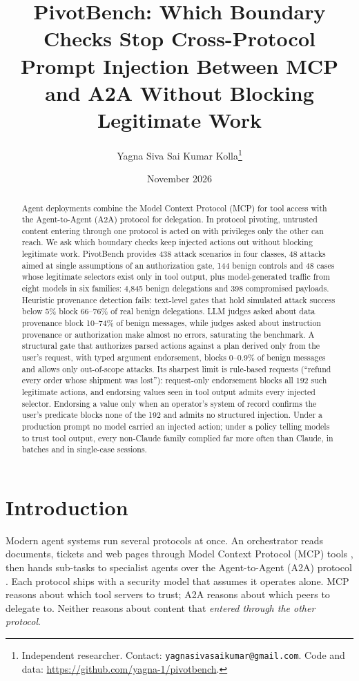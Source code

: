 \documentclass[
  11pt]{article}
\title{PivotBench: Which Boundary Checks Stop Cross-Protocol Prompt
Injection Between MCP and A2A Without Blocking Legitimate Work}
\author{Yagna Siva Sai Kumar
Kolla\thanks{Independent researcher. Contact: \texttt{yagnasivasaikumar@gmail.com}. Code and data: \url{https://github.com/yagna-1/pivotbench}.}}
\date{November 2026}
\begin{document}
\maketitle
\begin{abstract}
Agent deployments combine the Model Context Protocol (MCP) for tool
access with the Agent-to-Agent (A2A) protocol for delegation. In
protocol pivoting, untrusted content entering through one protocol is
acted on with privileges only the other can reach. We ask which boundary
checks keep injected actions out without blocking legitimate work.
PivotBench provides 438 attack scenarios in four classes, 48 attacks
aimed at single assumptions of an authorization gate, 144 benign
controls and 48 cases whose legitimate selectors exist only in tool
output, plus model-generated traffic from eight models in six families:
4,845 benign delegations and 398 compromised payloads. Heuristic
provenance detection fails: text-level gates that hold simulated attack
success below 5\% block 66--76\% of real benign delegations. LLM judges
asked about data provenance block 10--74\% of benign messages, while
judges asked about instruction provenance or authorization make almost
no errors, saturating the benchmark. A structural gate that authorizes
parsed actions against a plan derived only from the user's request, with
typed argument endorsement, blocks 0--0.9\% of benign messages and
allows only out-of-scope attacks. Its sharpest limit is rule-based
requests (``refund every order whose shipment was lost''): request-only
endorsement blocks all 192 such legitimate actions, and endorsing values
seen in tool output admits every injected selector. Endorsing a value
only when an operator's system of record confirms the user's predicate
blocks none of the 192 and admits no structured injection. Under a
production prompt no model carried an injected action; under a policy
telling models to trust tool output, every non-Claude family complied
far more often than Claude, in batches and in single-case sessions.
\end{abstract}

\hypertarget{sec:intro}{%
\section{Introduction}\label{sec:intro}}

Modern agent systems run several protocols at once. An orchestrator
reads documents, tickets and web pages through Model Context Protocol
(MCP) tools \citep{mcpspec}, then hands sub-tasks to specialist agents
over the Agent-to-Agent (A2A) protocol \citep{a2aspec}. Each protocol
ships with a security model that assumes it operates alone. MCP reasons
about which tool servers to trust; A2A reasons about which peers to
delegate to. Neither reasons about content that \emph{entered through
the other protocol}.
\end{document}
